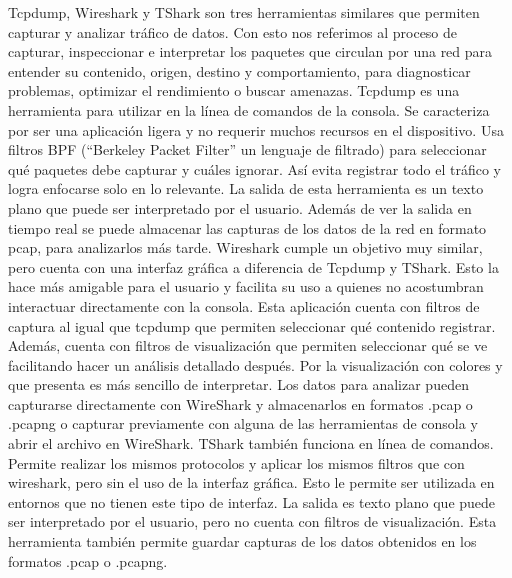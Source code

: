 \documentclass[12pt]{article} %
\begin{document}
Tcpdump, Wireshark y TShark son tres herramientas similares que permiten capturar y analizar tráfico de datos. Con esto nos referimos al proceso de capturar, inspeccionar e interpretar los paquetes que circulan por una red para entender su contenido, origen, destino y comportamiento, para diagnosticar problemas, optimizar el rendimiento o buscar amenazas.
\newline 
\newline 
Tcpdump es una herramienta para utilizar en la línea de comandos de la consola. Se caracteriza por ser una aplicación ligera y no requerir muchos recursos en el dispositivo. Usa filtros BPF (“Berkeley Packet Filter” un lenguaje de filtrado) para seleccionar qué paquetes debe capturar y cuáles ignorar. Así evita registrar todo el tráfico y logra enfocarse solo en lo relevante. La salida de esta herramienta es un texto plano que puede ser interpretado por el usuario. Además de ver la salida en tiempo real se puede almacenar las capturas de los datos de la red en formato pcap, para analizarlos más tarde.
\newline
\newline
Wireshark cumple un objetivo muy similar, pero cuenta con una interfaz gráfica a diferencia de Tcpdump y TShark. Esto la hace más amigable para el usuario y facilita su uso a quienes no acostumbran interactuar directamente con la consola. Esta aplicación cuenta con filtros de captura al igual que tcpdump que permiten seleccionar qué contenido registrar. Además, cuenta con filtros de visualización que permiten seleccionar qué se ve facilitando hacer un análisis detallado después. Por la visualización con colores y que presenta es más sencillo de interpretar. Los datos para analizar pueden capturarse directamente con WireShark y almacenarlos en  formatos .pcap o .pcapng o capturar previamente con alguna de las herramientas de consola y abrir el archivo en WireShark.
\newline
\newline
TShark también funciona en línea de comandos. Permite realizar los mismos protocolos y aplicar los mismos filtros que con wireshark, pero sin el uso de la interfaz gráfica. Esto le permite ser utilizada en entornos que no tienen este tipo de interfaz. La salida es texto plano que puede ser interpretado por el usuario, pero no cuenta con filtros de visualización. Esta herramienta también permite guardar capturas de los datos obtenidos en los formatos .pcap o .pcapng.
\newline
\newline
\end{document}
